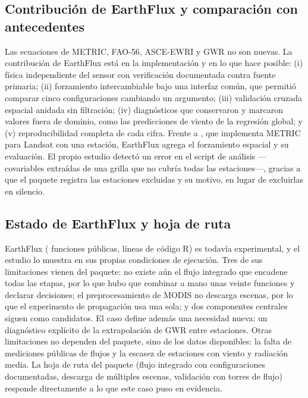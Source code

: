 \subsection{Contribución de EarthFlux y comparación con antecedentes}

Las ecuaciones de METRIC, FAO-56, ASCE-EWRI y GWR no son nuevas. La
contribución de EarthFlux está en la implementación y en lo que hace
posible: (i) física independiente del sensor con verificación documentada
contra fuente primaria; (ii) forzamiento intercambiable bajo una interfaz
común, que permitió comparar cinco configuraciones cambiando un argumento;
(iii) validación cruzada espacial anidada sin filtración; (iv) diagnósticos
que conservaron y marcaron valores fuera de dominio, como las predicciones
de viento de la regresión global; y (v) reproducibilidad completa de cada
cifra. Frente a  \parencite{olmedo2016water}, que implementa METRIC
para Landsat con una estación, EarthFlux agrega el forzamiento espacial y su
evaluación. El propio estudio detectó un error en el script de análisis
---covariables extraídas de una grilla que no cubría todas las estaciones---,
gracias a que el paquete registra las estaciones excluidas y su motivo, en
lugar de excluirlas en silencio.

\subsection{Estado de EarthFlux y hoja de ruta}

EarthFlux \EarthFluxVersion{} (\NExports{} funciones públicas, \NLinesR{} líneas
de código R) es todavía experimental, y el estudio lo muestra en sus propias
condiciones de ejecución. Tres de sus limitaciones vienen del paquete: no
existe aún el flujo integrado que encadene todas las etapas, por lo que hubo que
combinar a mano unas veinte funciones y declarar \NDecisions{} decisiones; el
preprocesamiento de MODIS no descarga escenas, por lo que el experimento de
propagación usa una sola; y dos componentes centrales siguen como candidatos.
El caso define además una necesidad nueva: un diagnóstico explícito de la
extrapolación de GWR entre estaciones. Otras limitaciones no dependen del
paquete, sino de los datos disponibles: la falta de mediciones públicas de
flujos y la escasez de estaciones con viento y radiación media. La hoja de ruta
del paquete (flujo integrado con configuraciones documentadas, descarga de
múltiples escenas, validación con torres de flujo) responde directamente a lo
que este caso puso en evidencia.

